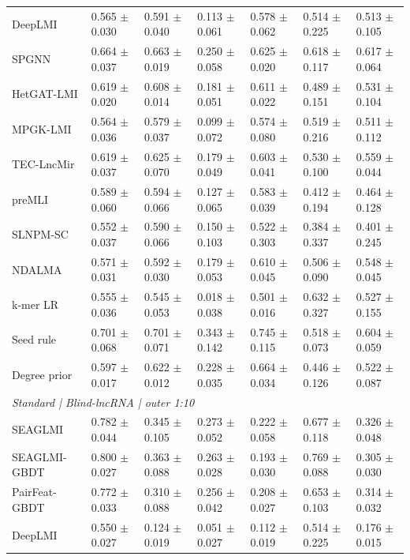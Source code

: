 \begin{landscape}
{\begin{longtable}{lllllll}
DeepLMI & 0.565 $\pm$ 0.030 & 0.591 $\pm$ 0.040 & 0.113 $\pm$ 0.061 & 0.578 $\pm$ 0.062 & 0.514 $\pm$ 0.225 & 0.513 $\pm$ 0.105 \\
SPGNN & 0.664 $\pm$ 0.037 & 0.663 $\pm$ 0.019 & 0.250 $\pm$ 0.058 & 0.625 $\pm$ 0.020 & 0.618 $\pm$ 0.117 & 0.617 $\pm$ 0.064 \\
HetGAT-LMI & 0.619 $\pm$ 0.020 & 0.608 $\pm$ 0.014 & 0.181 $\pm$ 0.051 & 0.611 $\pm$ 0.022 & 0.489 $\pm$ 0.151 & 0.531 $\pm$ 0.104 \\
MPGK-LMI & 0.564 $\pm$ 0.036 & 0.579 $\pm$ 0.037 & 0.099 $\pm$ 0.072 & 0.574 $\pm$ 0.080 & 0.519 $\pm$ 0.216 & 0.511 $\pm$ 0.112 \\
TEC-LncMir & 0.619 $\pm$ 0.037 & 0.625 $\pm$ 0.070 & 0.179 $\pm$ 0.049 & 0.603 $\pm$ 0.041 & 0.530 $\pm$ 0.100 & 0.559 $\pm$ 0.044 \\
preMLI & 0.589 $\pm$ 0.060 & 0.594 $\pm$ 0.066 & 0.127 $\pm$ 0.065 & 0.583 $\pm$ 0.039 & 0.412 $\pm$ 0.194 & 0.464 $\pm$ 0.128 \\
SLNPM-SC & 0.552 $\pm$ 0.037 & 0.590 $\pm$ 0.066 & 0.150 $\pm$ 0.103 & 0.522 $\pm$ 0.303 & 0.384 $\pm$ 0.337 & 0.401 $\pm$ 0.245 \\
NDALMA & 0.571 $\pm$ 0.031 & 0.592 $\pm$ 0.030 & 0.179 $\pm$ 0.053 & 0.610 $\pm$ 0.045 & 0.506 $\pm$ 0.090 & 0.548 $\pm$ 0.045 \\
k-mer LR & 0.555 $\pm$ 0.036 & 0.545 $\pm$ 0.053 & 0.018 $\pm$ 0.038 & 0.501 $\pm$ 0.016 & 0.632 $\pm$ 0.327 & 0.527 $\pm$ 0.155 \\
Seed rule & 0.701 $\pm$ 0.068 & 0.701 $\pm$ 0.071 & 0.343 $\pm$ 0.142 & 0.745 $\pm$ 0.115 & 0.518 $\pm$ 0.073 & 0.604 $\pm$ 0.059 \\
Degree prior & 0.597 $\pm$ 0.017 & 0.622 $\pm$ 0.012 & 0.228 $\pm$ 0.035 & 0.664 $\pm$ 0.034 & 0.446 $\pm$ 0.126 & 0.522 $\pm$ 0.087 \\
\multicolumn{7}{l}{\textit{Standard | Blind-lncRNA | outer 1:10}}\\
SEAGLMI & 0.782 $\pm$ 0.044 & 0.345 $\pm$ 0.105 & 0.273 $\pm$ 0.052 & 0.222 $\pm$ 0.058 & 0.677 $\pm$ 0.118 & 0.326 $\pm$ 0.048 \\
SEAGLMI-GBDT & 0.800 $\pm$ 0.027 & 0.363 $\pm$ 0.088 & 0.263 $\pm$ 0.028 & 0.193 $\pm$ 0.030 & 0.769 $\pm$ 0.088 & 0.305 $\pm$ 0.030 \\
PairFeat-GBDT & 0.772 $\pm$ 0.033 & 0.310 $\pm$ 0.088 & 0.256 $\pm$ 0.042 & 0.208 $\pm$ 0.027 & 0.653 $\pm$ 0.103 & 0.314 $\pm$ 0.032 \\
DeepLMI & 0.550 $\pm$ 0.027 & 0.124 $\pm$ 0.019 & 0.051 $\pm$ 0.027 & 0.112 $\pm$ 0.019 & 0.514 $\pm$ 0.225 & 0.176 $\pm$ 0.015 \\

\end{longtable}}
\end{landscape}
